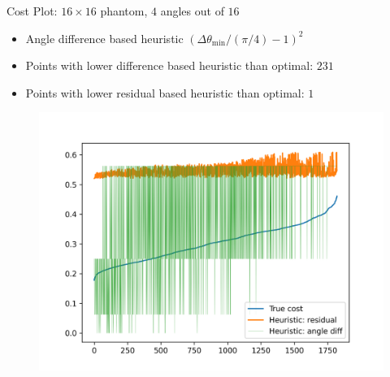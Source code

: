 \documentclass[english,aspectratio=43]{beamer}
\begin{document}
\begin{frame}{Cost Plot: $16 \times 16$ phantom, $4$ angles out of $16$ }
	\begin{itemize}
	    \item Angle difference based heuristic $(\Delta \theta_{\text{min}}/(\pi/4) - 1)^2$
	    \item Points with lower difference based heuristic than optimal: $231$
	    \item Points with lower residual based heuristic than optimal: $1$
        
	\end{itemize}
	
	\begin{figure}
    \includegraphics[scale=0.5]{Figs/cost_comparison2_16-16-4.png}
    \end{figure}
    
\end{frame}
\end{document}
